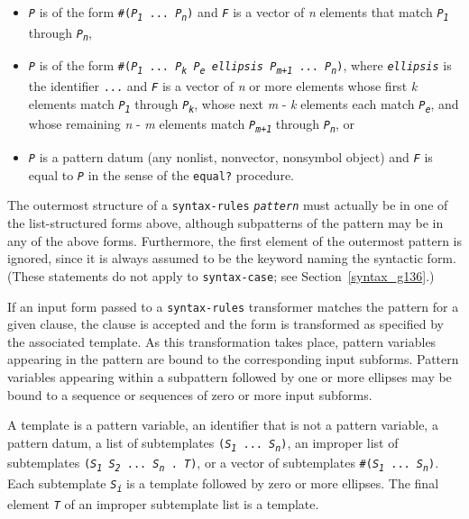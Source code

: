 \begin{itemize}
\item 
\texttt{\textit{P}} is of the form
\texttt{\#{}(\textit{P\textsubscript{1}} ... \textit{P\textsubscript{n}})}
and \texttt{\textit{F}} is a vector of \textit{n} elements that match \texttt{\textit{P\textsubscript{1}}} through
\texttt{\textit{P\textsubscript{n}}},

\item 
\texttt{\textit{P}} is of the form
\texttt{\#{}(\textit{P\textsubscript{1}} ... \textit{P\textsubscript{k}} \textit{P\textsubscript{e}} \textit{ellipsis} \textit{P\textsubscript{\textit{m}+1}} ... \textit{P\textsubscript{n}})},
where \texttt{\textit{ellipsis}} is the identifier \texttt{...}
and \texttt{\textit{F}} is a vector of \textit{n} or more elements
whose first \textit{k} elements match \texttt{\textit{P\textsubscript{1}}} through \texttt{\textit{P\textsubscript{k}}},
whose next \textit{m} - \textit{k} elements each match \texttt{\textit{P\textsubscript{e}}},
and
whose remaining \textit{n} - \textit{m} elements match \texttt{\textit{P\textsubscript{\textit{m}+1}}} through \texttt{\textit{P\textsubscript{n}}},
or

\item 
\texttt{\textit{P}} is a pattern datum (any nonlist, nonvector, nonsymbol
object) and \texttt{\textit{F}} is equal to \texttt{\textit{P}} in the sense of the
\texttt{equal?} procedure.

\end{itemize}


The outermost structure of a \texttt{syntax-rules} \texttt{\textit{pattern}}
must actually be in one of the list-structured forms above, although
subpatterns of the pattern may be in any of the above forms.
Furthermore, the first element of the outermost pattern is ignored,
since it is always assumed to be the keyword naming the
syntactic form.
(These statements do not apply to \texttt{syntax-case}; see
Section \ref{syntax_g136}.)


If an input form passed to a \texttt{syntax-rules} transformer
matches the pattern for a given clause, the clause
is accepted and the form is transformed as specified by the
associated template.
As this transformation takes place,
pattern variables appearing in the pattern
are bound to the corresponding input subforms.
Pattern variables appearing within a subpattern followed by
one or more ellipses may be bound to a sequence or sequences of zero or more
input subforms.


\label{syntax_s23}A template is a pattern variable, an identifier that
is not a pattern
variable, a pattern datum, a list of subtemplates
\texttt{(\textit{S\textsubscript{1}} ... \textit{S\textsubscript{n}})}, an improper list of subtemplates
\texttt{(\textit{S\textsubscript{1}} \textit{S\textsubscript{2}} ... \textit{S\textsubscript{n}} . \textit{T})}, or a
vector of subtemplates \texttt{\#{}(\textit{S\textsubscript{1}} ... \textit{S\textsubscript{n}})}.
Each subtemplate \texttt{\textit{S\textsubscript{i}}} is a template
followed by zero or more ellipses.
The final element \texttt{\textit{T}} of an improper subtemplate list is a template.


